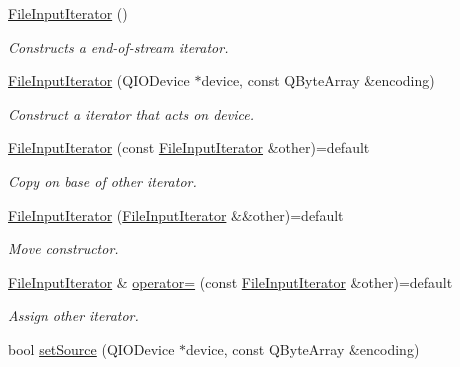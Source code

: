 \begin{DoxyCompactItemize}
\item 
\hyperlink{struct_mdt_1_1_plain_text_1_1_file_input_iterator_a53ed659924fc406bd89c6c6f04018159}{File\+Input\+Iterator} ()
\begin{DoxyCompactList}\small\item\em Constructs a end-\/of-\/stream iterator. \end{DoxyCompactList}\item 
\hyperlink{struct_mdt_1_1_plain_text_1_1_file_input_iterator_ad34d8fff6203f66a4e78283c30079a8f}{File\+Input\+Iterator} (Q\+I\+O\+Device $\ast$device, const Q\+Byte\+Array \&encoding)
\begin{DoxyCompactList}\small\item\em Construct a iterator that acts on device. \end{DoxyCompactList}\item 
\hyperlink{struct_mdt_1_1_plain_text_1_1_file_input_iterator_a7cba55a1d994d46dcddd36dcbf79381b}{File\+Input\+Iterator} (const \hyperlink{struct_mdt_1_1_plain_text_1_1_file_input_iterator}{File\+Input\+Iterator} \&other)=default
\begin{DoxyCompactList}\small\item\em Copy on base of other iterator. \end{DoxyCompactList}\item 
\hyperlink{struct_mdt_1_1_plain_text_1_1_file_input_iterator_aa3921f03022ead216ef23e27aae1ea69}{File\+Input\+Iterator} (\hyperlink{struct_mdt_1_1_plain_text_1_1_file_input_iterator}{File\+Input\+Iterator} \&\&other)=default
\begin{DoxyCompactList}\small\item\em Move constructor. \end{DoxyCompactList}\item 
\hyperlink{struct_mdt_1_1_plain_text_1_1_file_input_iterator}{File\+Input\+Iterator} \& \hyperlink{struct_mdt_1_1_plain_text_1_1_file_input_iterator_adc29c4e6d155d676ca78d1f5ab8032f0}{operator=} (const \hyperlink{struct_mdt_1_1_plain_text_1_1_file_input_iterator}{File\+Input\+Iterator} \&other)=default
\begin{DoxyCompactList}\small\item\em Assign other iterator. \end{DoxyCompactList}\item 
bool \hyperlink{struct_mdt_1_1_plain_text_1_1_file_input_iterator_a5c8774871108780cc0c746a2b37163c5}{set\+Source} (Q\+I\+O\+Device $\ast$device, const Q\+Byte\+Array \&encoding)

\end{DoxyCompactItemize}
